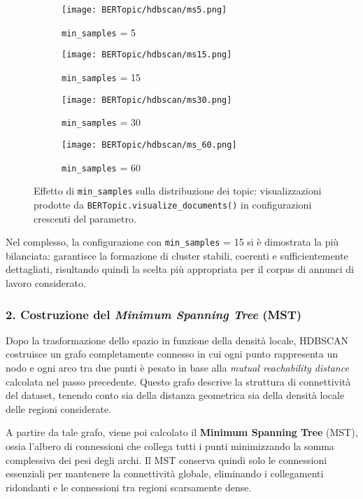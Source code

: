 \begin{figure}[H]
\centering
\begin{subfigure}{0.24\textwidth}
    \centering
    \texttt{[image: BERTopic/hdbscan/ms5.png]}
    \caption{\texttt{min\_samples} = 5}
\end{subfigure}\hfill
\begin{subfigure}{0.24\textwidth}
    \centering
    \texttt{[image: BERTopic/hdbscan/ms15.png]}
    \caption{\texttt{min\_samples} = 15}
\end{subfigure}\hfill
\begin{subfigure}{0.24\textwidth}
    \centering
    \texttt{[image: BERTopic/hdbscan/ms30.png]}
    \caption{\texttt{min\_samples} = 30}
\end{subfigure}\hfill
\begin{subfigure}{0.24\textwidth}
    \centering
    \texttt{[image: BERTopic/hdbscan/ms\_60.png]}
    \caption{\texttt{min\_samples} = 60}
\end{subfigure}
\caption{Effetto di \texttt{min\_samples} sulla distribuzione dei topic: visualizzazioni prodotte da \texttt{BERTopic.visualize\_documents()} in configurazioni crescenti del parametro.}
\label{fig:min-samples-umap}
\end{figure}

Nel complesso, la configurazione con \texttt{min\_samples} = 15 si è dimostrata la più bilanciata: 
garantisce la formazione di cluster stabili, coerenti e sufficientemente dettagliati, risultando quindi la scelta più appropriata per il corpus di annunci di lavoro considerato.

\subsubsection*{2. Costruzione del \textit{Minimum Spanning Tree} (MST)}

Dopo la trasformazione dello spazio in funzione della densità locale, HDBSCAN costruisce un grafo completamente connesso in cui ogni punto rappresenta un nodo e ogni arco tra due punti è pesato in base alla \textit{mutual reachability distance} calcolata nel passo precedente. 
Questo grafo descrive la struttura di connettività del dataset, tenendo conto sia della distanza geometrica sia della densità locale delle regioni considerate.

A partire da tale grafo, viene poi calcolato il \textbf{Minimum Spanning Tree} (MST), ossia l'albero di connessioni che collega tutti i punti minimizzando la somma complessiva dei pesi degli archi. 
Il MST conserva quindi solo le connessioni essenziali per mantenere la connettività globale, eliminando i collegamenti ridondanti e le connessioni tra regioni scarsamente dense.

